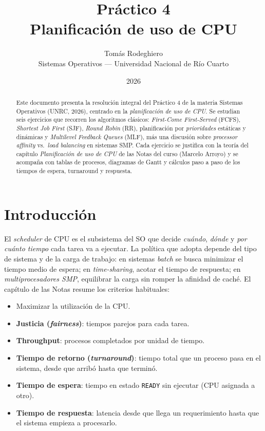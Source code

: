 \documentclass[11pt,a4paper]{article}
\title{
    \vspace{-2.5em}
    \textbf{Práctico 4} \\[0.3em]
    \large Planificación de uso de CPU
}
\author{
    Tomás Rodeghiero \\
    \small Sistemas Operativos --- Universidad Nacional de Río Cuarto
}
\date{2026}
\begin{document}
\maketitle

\begin{abstract}
\noindent
Este documento presenta la resolución integral del Práctico 4 de la
materia Sistemas Operativos (UNRC, 2026), centrado en la
\emph{planificación de uso de CPU}. Se estudian seis ejercicios que
recorren los algoritmos clásicos: \emph{First-Come First-Served}
(FCFS), \emph{Shortest Job First} (SJF), \emph{Round Robin} (RR),
planificación por \emph{prioridades} estáticas y dinámicas y
\emph{Multilevel Feedback Queues} (MLF), más una discusión sobre
\emph{processor affinity} vs.\ \emph{load balancing} en sistemas SMP.
Cada ejercicio se justifica con la teoría del capítulo
\emph{Planificación de uso de CPU} de las Notas del curso (Marcelo
Arroyo) y se acompaña con tablas de procesos, diagramas de Gantt y
cálculos paso a paso de los tiempos de espera, turnaround y respuesta.
\end{abstract}

\tableofcontents
\bigskip

\section{Introducción}

El \emph{scheduler} de CPU es el subsistema del SO que decide
\emph{cuándo}, \emph{dónde} y \emph{por cuánto tiempo} cada tarea va
a ejecutar. La política que adopta depende del tipo de sistema y de
la carga de trabajo: en sistemas \emph{batch} se busca minimizar el
tiempo medio de espera; en \emph{time-sharing}, acotar el tiempo de
respuesta; en \emph{multiprocesadores SMP}, equilibrar la carga sin
romper la afinidad de caché. El capítulo de las Notas resume los
criterios habituales:

\begin{itemize}[leftmargin=*,nosep]
    \item Maximizar la utilización de la CPU.
    \item \textbf{Justicia (\emph{fairness})}: tiempos parejos para
        cada tarea.
    \item \textbf{Throughput}: procesos completados por unidad de
        tiempo.
    \item \textbf{Tiempo de retorno (\emph{turnaround})}: tiempo total
        que un proceso pasa en el sistema, desde que arribó hasta que
        terminó.
    \item \textbf{Tiempo de espera}: tiempo en estado \texttt{READY}
        sin ejecutar (CPU asignada a otro).
    \item \textbf{Tiempo de respuesta}: latencia desde que llega un
        requerimiento hasta que el sistema empieza a procesarlo.
\end{itemize}
\end{document}
